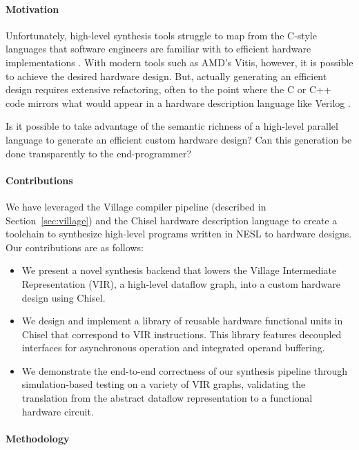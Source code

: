 \documentclass[sigconf, nonacm]{acmart}
\begin{document}
\paragraph{Motivation}

Unfortunately, high-level synthesis tools struggle to map from the C-style languages that software engineers are familiar with to efficient hardware implementations \cite{hls-challenges}.
With modern tools such as AMD's Vitis, however, it is possible to achieve the desired hardware design.
But, actually generating an efficient design requires extensive refactoring, often to the point where the C or C++ code mirrors what would appear in a hardware description language like Verilog \cite{hls-amd-refactoring}.

Is it possible to take advantage of the semantic richness of a high-level parallel language to generate an efficient custom hardware design?
Can this generation be done transparently to the end-programmer?

\paragraph{Contributions}

We have leveraged the Village compiler pipeline (described in Section~\ref{sec:village}) and the Chisel hardware description language to create a toolchain to synthesize high-level programs written in NESL to hardware designs.
Our contributions are as follows:

\begin{itemize}
	\item We present a novel synthesis backend that lowers the Village Intermediate Representation (VIR), a high-level data\-flow graph, into a custom hardware design using Chisel.
	\item We design and implement a library of reusable hardware functional units in Chisel that correspond to VIR instructions. This library features decoupled interfaces for asynchronous operation and integrated operand buffering.
	\item We demonstrate the end-to-end correctness of our synthesis pipeline through simulation-based testing on a variety of VIR graphs, validating the translation from the abstract dataflow representation to a functional hardware circuit.
\end{itemize}

\paragraph{Methodology}
\end{document}
